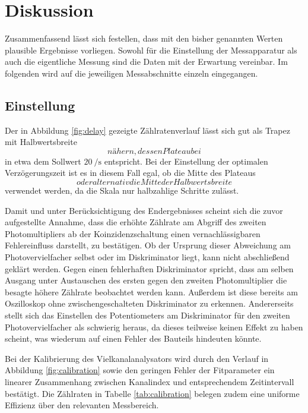\section{Diskussion}

Zusammenfassend lässt sich festellen, dass mit den bisher genannten Werten plausible Ergebnisse
vorliegen. Sowohl für die Einstellung der Messapparatur als auch die eigentliche Messung sind die
Daten mit der Erwartung vereinbar. Im folgenden wird auf die jeweiligen Messabschnitte einzeln
eingegangen.



\subsection{Einstellung}

Der in Abbildung \ref{fig:delay} gezeigte Zählratenverlauf lässt sich gut als Trapez mit Halbwertsbreite
$$ nähern, dessen Plateau bei $$ in etwa dem Sollwert
$\qty{20}{\per\second}$ entspricht. Bei der Einstellung der optimalen Verzögerungszeit ist es in diesem
Fall egal, ob die Mitte des Plateaus $$ oder alternativ die Mitte der Halbwertsbreite
$$ verwendet werden, da die Skala nur halbzahlige Schritte zulässt.

Damit und unter Berücksichtigung des Endergebnisses scheint sich die zuvor aufgestellte Annahme, dass die
erhöhte Zählrate am Abgriff des zweiten Photomultipliers ab der Koinzidenzschaltung einen vernachlässigbaren
Fehlereinfluss darstellt, zu bestätigen. Ob der Ursprung dieser Abweichung am Photovervielfacher
selbst oder im Diskriminator liegt, kann nicht abschließend geklärt werden. Gegen einen fehlerhaften
Diskriminator spricht, dass am selben Ausgang unter Austauschen des ersten gegen den zweiten
Photomultiplier die besagte höhere Zählrate beobachtet werden kann. Außerdem ist diese bereits
am Oszilloskop ohne zwischengeschalteten Diskriminator zu erkennen. Andererseits stellt sich das
Einstellen des Potentiometers am Diskriminator für den zweiten Photovervielfacher als schwierig
heraus, da dieses teilweise keinen Effekt zu haben scheint, was wiederum auf einen Fehler des
Bauteils hindeuten könnte.

Bei der Kalibrierung des Vielkanalanalysators wird durch den Verlauf in Abbildung \ref{fig:calibration}
sowie den geringen Fehler der Fitparameter ein linearer Zusammenhang zwischen Kanalindex und entsprechendem
Zeitintervall bestätigt. Die Zählraten in Tabelle \ref{tab:calibration} belegen zudem eine uniforme Effizienz
über den relevanten Messbereich.



